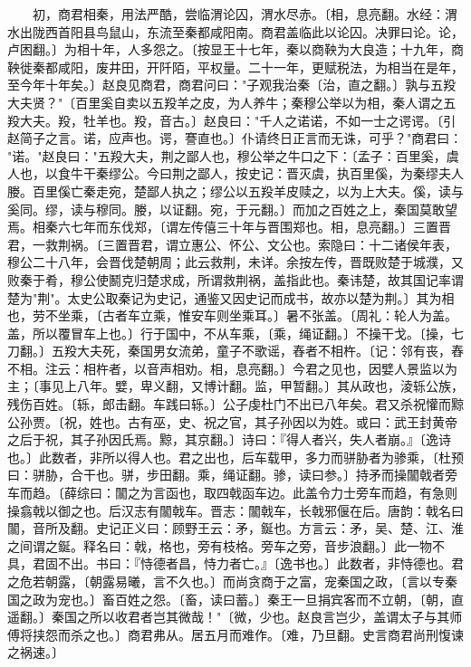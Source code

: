 　　初，商君相秦，用法严酷，尝临渭论囚，渭水尽赤。〔相，息亮翻。水经：渭水出陇西首阳县鸟鼠山，东流至秦都咸阳南。商君盖临此以论囚。决罪曰论。论，卢困翻。〕为相十年，人多怨之。〔按显王十七年，秦以商鞅为大良造；十九年，商鞅徙秦都咸阳，废井田，开阡陌，平权量。二十一年，更赋税法，为相当在是年，至今年十年矣。〕赵良见商君，商君问曰："子观我治秦〔治，直之翻。〕孰与五羖大夫贤？"〔百里奚自卖以五羖羊之皮，为人养牛；秦穆公举以为相，秦人谓之五羖大夫。羖，牡羊也。羖，音古。〕赵良曰："千人之诺诺，不如一士之谔谔。〔引赵简子之言。诺，应声也。谔，謇直也。〕仆请终日正言而无诛，可乎？"商君曰： "诺。"赵良曰："五羖大夫，荆之鄙人也，穆公举之牛口之下：〔孟子：百里奚，虞人也，以食牛干秦缪公。今曰荆之鄙人，按史记：晋灭虞，执百里傒，为秦缪夫人媵。百里傒亡秦走宛，楚鄙人执之；缪公以五羖羊皮赎之，以为上大夫。傒，读与奚同。缪，读与穆同。媵，以证翻。宛，于元翻。〕而加之百姓之上，秦国莫敢望焉。相秦六七年而东伐郑，〔谓左传僖三十年与晋围郑也。相，息亮翻。〕三置晋君，一救荆祸。〔三置晋君，谓立惠公、怀公、文公也。索隐曰：十二诸侯年表，穆公二十八年，会晋伐楚朝周；此云救荆，未详。余按左传，晋既败楚于城濮，又败秦于肴，穆公使鬭克归楚求成，所谓救荆祸，盖指此也。秦讳楚，故其国记率谓楚为"荆"。太史公取秦记为史记，通鉴又因史记而成书，故亦以楚为荆。〕其为相也，劳不坐乘，〔古者车立乘，惟安车则坐乘耳。〕暑不张盖。〔周礼：轮人为盖。盖，所以覆冒车上也。〕行于国中，不从车乘，〔乘，绳证翻。〕不操干戈。〔操，七刀翻。〕五羖大夫死，秦国男女流弟，童子不歌谣，舂者不相杵。〔记：邻有丧，舂不相。注云：相杵者，以音声相劝。相，息亮翻。〕今君之见也，因嬖人景监以为主；〔事见上八年。嬖，卑义翻，又博计翻。监，甲暂翻。〕其从政也，淩轹公族，残伤百姓。〔轹，郎击翻。车践曰轹。〕公子虔杜门不出已八年矣。君又杀祝懽而黥公孙贾。〔祝，姓也。古有巫，史、祝之官，其子孙因以为姓。或曰：武王封黄帝之后于祝，其子孙因氏焉。黥，其京翻。〕诗曰：『得人者兴，失人者崩。』〔逸诗也。〕此数者，非所以得人也。君之出也，后车载甲，多力而骈胁者为骖乘，〔杜预曰：骈胁，合干也。骈，步田翻。乘，绳证翻。骖，读曰参。〕持矛而操闟戟者旁车而趋。〔薛综曰：闟之为言函也，取四戟函车边。此盖令力士旁车而趋，有急则操翕戟以御之也。后汉志有闟戟车。晋志：闟戟车，长戟邪偃在后。唐韵：戟名曰闟，音所及翻。史记正义曰：顾野王云：矛，鋋也。方言云：矛，吴、楚、江、淮之间谓之鋋。释名曰：戟，格也，旁有枝格。旁车之旁，音步浪翻。〕此一物不具，君固不出。书曰：『恃德者昌，恃力者亡。』〔逸书也。〕此数者，非恃德也。君之危若朝露，〔朝露易曦，言不久也。〕而尚贪商于之富，宠秦国之政，〔言以专秦国之政为宠也。〕畜百姓之怨。〔畜，读曰蓄。〕秦王一旦捐宾客而不立朝，〔朝，直遥翻。〕秦国之所以收君者岂其微哉！"〔微，少也。赵良言岂少，盖谓太子与其师傅将挟怨而杀之也。〕商君弗从。居五月而难作。〔难，乃旦翻。史言商君尚刑愎谏之祸速。〕

